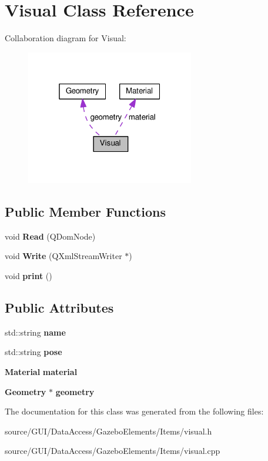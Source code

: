 \section{Visual Class Reference}
\label{class_visual}


Collaboration diagram for Visual\+:\nopagebreak
\begin{figure}[H]
\begin{center}
\leavevmode
\includegraphics[width=208pt]{class_visual__coll__graph}
\end{center}
\end{figure}
\subsection*{Public Member Functions}
\begin{DoxyCompactItemize}
\item 
void {\bfseries Read} (Q\+Dom\+Node)\label{class_visual_aeb9572f92928bb7f5efae3d9f3e6ee60}

\item 
void {\bfseries Write} (Q\+Xml\+Stream\+Writer $\ast$)\label{class_visual_ab379e1e1277385c9f6d8558121d9f450}

\item 
void {\bfseries print} ()\label{class_visual_a5eb3750293fdd7b7dbd58bc977c734ba}

\end{DoxyCompactItemize}
\subsection*{Public Attributes}
\begin{DoxyCompactItemize}
\item 
std\+::string {\bfseries name}\label{class_visual_a29bd4fe632f392d01d2e084ce2a18d18}

\item 
std\+::string {\bfseries pose}\label{class_visual_aa9cae2e681f95fbb0dbb6fab6eade747}

\item 
{\bf Material} {\bfseries material}\label{class_visual_a9b286d5925cd4aada84a363f002a670e}

\item 
{\bf Geometry} $\ast$ {\bfseries geometry}\label{class_visual_ab7158c6c59e489a098bc991875b24f58}

\end{DoxyCompactItemize}


The documentation for this class was generated from the following files\+:\begin{DoxyCompactItemize}
\item 
source/\+G\+U\+I/\+Data\+Access/\+Gazebo\+Elements/\+Items/visual.\+h\item 
source/\+G\+U\+I/\+Data\+Access/\+Gazebo\+Elements/\+Items/visual.\+cpp\end{DoxyCompactItemize}
